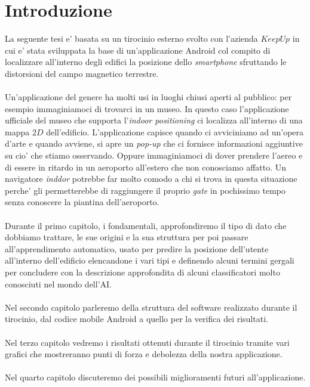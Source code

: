 \chapter{Introduzione}
La seguente tesi e' basata su un tirocinio esterno svolto con l'azienda $KeepUp$ in cui e' stata sviluppata la base di un'applicazione Android col compito di localizzare all'interno degli edifici la posizione dello \textit{smartphone} sfruttando le distorsioni del campo magnetico terrestre.
\\\\
Un'applicazione del genere ha molti usi in luoghi chiusi aperti al pubblico: per esempio immaginiamoci di trovarci in un museo. In questo caso l'applicazione ufficiale del museo che supporta l'\textit{indoor positioning} ci localizza all'interno di una mappa $2D$ dell'edificio. L'applicazione capisce quando ci avviciniamo ad un'opera d'arte e quando avviene, si apre un \textit{pop-up} che ci fornisce informazioni aggiuntive su cio' che stiamo osservando. Oppure immaginiamoci di dover prendere l'aereo e di essere in ritardo in un aeroporto all'estero che non conosciamo affatto. Un navigatore \textit{inddor} potrebbe far molto comodo a chi si trova in questa situazione perche' gli permetterebbe di raggiungere il proprio \textit{gate} in pochissimo tempo senza conoscere la piantina dell'aeroporto.
\\\\
Durante il primo capitolo, i fondamentali, approfondiremo il tipo di dato che dobbiamo trattare, le sue origini e la sua struttura per poi passare all'apprendimento automatico, usato per predire la posizione dell'utente all'interno dell'edificio elencandone i vari tipi e definendo alcuni termini gergali per concludere con la descrizione approfondita di alcuni classificatori molto conosciuti nel mondo dell'AI.
\\\\
Nel secondo capitolo parleremo della struttura del software realizzato durante il tirocinio, dal codice mobile Android a quello per la verifica dei risultati.
\\\\
Nel terzo capitolo vedremo i risultati ottenuti durante il tirocinio tramite vari grafici che mostreranno punti di forza e debolezza della nostra applicazione.
\\\\
Nel quarto capitolo discuteremo dei possibili miglioramenti futuri all'applicazione.